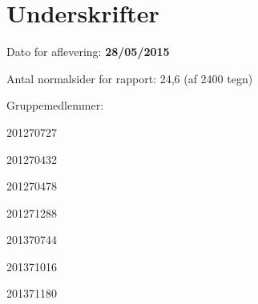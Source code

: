 \chapter*{Underskrifter}

Dato for aflevering: \textbf{28/05/2015}

Antal normalsider for rapport: 24,6 (af 2400 tegn)

Gruppemedlemmer:
\vspace{1cm}

\signature{Anders Bæk Møller}{201270727}
\signature{Bjørn Sørensen}{201270432}
\signature{Jesper Christensen}{201270478}
\signature{Lasse Beck Thostrup}{201271288}
\signature{Lars Harup Holm}{201370744}
\signature{Loc Dai Le}{201371016}
\signature{Michael Toft Jensen}{201371180}

\vspace{2cm}
\signature{Vejleder: Frank Bodholdt Jakobsen}{}



